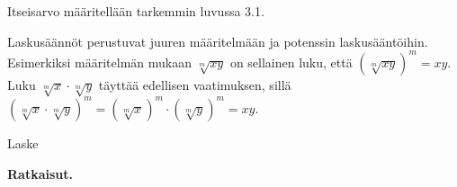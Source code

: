 Itseisarvo määritellään tarkemmin luvussa 3.1. %

Laskusäännöt perustuvat juuren määritelmään ja potenssin laskusääntöihin. Esimerkiksi
määritelmän mukaan $\sqrt[m]{xy}$ on sellainen luku, että $\left( \sqrt[m]{xy} \right)^m = xy$.
Luku $\sqrt[m]{x} \cdot \sqrt[m]{y}$ täyttää edellisen vaatimuksen, sillä
$\left( \sqrt[m]{x} \cdot \sqrt[m]{y} \right)^m = \left( \sqrt[m]{x} \right)^m \cdot \left( \sqrt[m]{y} \right)^m = xy$.

\begin{esimerkki}
Laske

{\bf Ratkaisut.}

\end{esimerkki}



